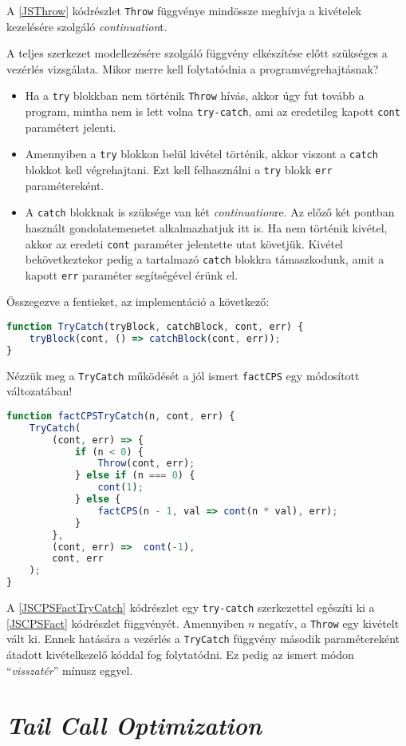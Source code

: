 A \ref{JSThrow} kódrészlet \texttt{Throw} függvénye mindössze meghívja a kivételek kezelésére szolgáló \textit{continuation}t.

A teljes szerkezet modellezésére szolgáló függvény elkészítése előtt szükséges a vezérlés vizsgálata. Mikor merre kell folytatódnia a programvégrehajtásnak?

\begin{itemize}
    \item Ha a \texttt{try} blokkban nem történik \texttt{Throw} hívás, akkor úgy fut tovább a program, mintha nem is lett volna \texttt{try-catch}, ami az eredetileg kapott \texttt{cont} paramétert jelenti.
    \item Amennyiben a \texttt{try} blokkon belül kivétel történik, akkor viszont a \texttt{catch} blokkot kell végrehajtani. Ezt kell felhasználni a \texttt{try} blokk \texttt{err} paramétereként.
    \item A \texttt{catch} blokknak is szüksége van két \textit{continuation}re. Az előző két pontban használt gondolatemenetet alkalmazhatjuk itt is. Ha nem történik kivétel, akkor az eredeti \texttt{cont} paraméter jelentette utat követjük. Kivétel bekövetkeztekor pedig a tartalmazó \texttt{catch} blokkra támaszkodunk, amit a kapott \texttt{err} paraméter segítségével érünk el.
\end{itemize}

Összegezve a fentieket, az implementáció a következő:

\begin{lstlisting}[language=JavaScript, caption={A \textit{try-catch} blokk \textit{CPS}-ben}, captionpos=b, label=JSTryCatch]
function TryCatch(tryBlock, catchBlock, cont, err) {
    tryBlock(cont, () => catchBlock(cont, err));
}
\end{lstlisting}

Nézzük meg a \texttt{TryCatch} működését a jól ismert \texttt{factCPS} egy módosított változatában!

\begin{lstlisting}[language=JavaScript, caption={Faktoriálist kiszámító függvény \textit{CPS}-ben, \texttt{try-catch} szerkezettel}, captionpos=b, label=JSCPSFactTryCatch]
function factCPSTryCatch(n, cont, err) {
    TryCatch(
        (cont, err) => {
            if (n < 0) {
                Throw(cont, err); 
            } else if (n === 0) {
                cont(1);
            } else {
                factCPS(n - 1, val => cont(n * val), err);
            }    
        }, 
        (cont, err) =>  cont(-1),
        cont, err
    );
}
\end{lstlisting}

A \ref{JSCPSFactTryCatch} kódrészlet egy \texttt{try-catch} szerkezettel egészíti ki a \ref{JSCPSFact} kódrészlet függvényét. Amennyiben $n$ negatív, a \texttt{Throw} egy kivételt vált ki. Ennek hatására a vezérlés a \texttt{TryCatch} függvény második paramétereként átadott kivételkezelő kóddal fog folytatódni. Ez pedig az ismert módon ``\textit{visszatér}'' mínusz eggyel.

\section{\textit{Tail Call Optimization}}